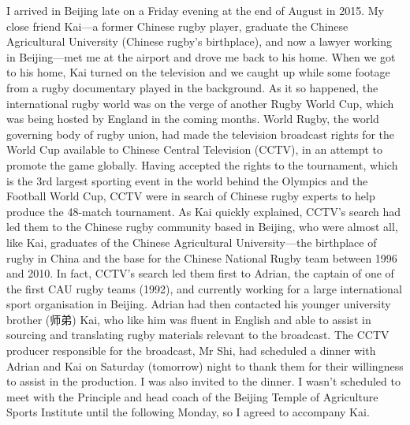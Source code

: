 I arrived in Beijing late on a Friday evening at the end of August in 2015.  My close friend Kai---a former Chinese rugby player, graduate the Chinese Agricultural University (Chinese rugby's birthplace), and now a lawyer working in Beijing---met me at the airport and drove me back to his home.  When we got to his home, Kai turned on the television and we caught up while some footage from a rugby documentary played in the background.  As it so happened, the international rugby world was on the verge of another Rugby World Cup, which was being hosted by England in the coming months. World Rugby, the world governing body of rugby union, had made the television broadcast rights for the World Cup available to Chinese Central Television (CCTV), in an attempt to promote the game globally.  Having accepted the rights to the tournament, which is the 3rd largest sporting event in the world behind the Olympics and the Football World Cup, CCTV were in search of Chinese rugby experts to help produce the 48-match tournament.  As Kai quickly explained, CCTV's search had led them to the Chinese rugby community based in Beijing, who were almost all, like Kai, graduates of the Chinese Agricultural University---the birthplace of rugby in China and the base for the Chinese National Rugby team between 1996 and 2010.  In fact, CCTV's search led them first to Adrian, the captain of one of the first CAU rugby teams (1992), and currently working for a large international sport organisation in Beijing.  Adrian had then contacted his younger university brother (师弟) Kai, who like him was fluent in English and able to assist in sourcing and translating rugby materials relevant to the broadcast. The CCTV producer responsible for the broadcast, Mr Shi, had scheduled a dinner with Adrian and Kai on Saturday (tomorrow) night to thank them for their willingness to assist in the production.  I was also invited to the dinner. I wasn't scheduled to meet with the Principle and head coach of the Beijing Temple of Agriculture Sports Institute until the following Monday, so I agreed to accompany Kai.
